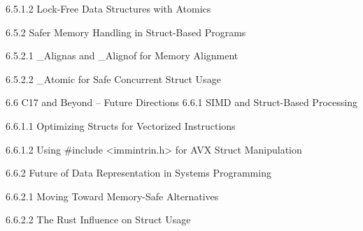 6.5.1.2 Lock-Free Data Structures with Atomics

6.5.2 Safer Memory Handling in Struct-Based Programs

6.5.2.1 _Alignas and _Alignof for Memory Alignment

6.5.2.2 _Atomic for Safe Concurrent Struct Usage

6.6 C17 and Beyond – Future Directions
6.6.1 SIMD and Struct-Based Processing

6.6.1.1 Optimizing Structs for Vectorized Instructions

6.6.1.2 Using #include <immintrin.h> for AVX Struct Manipulation

6.6.2 Future of Data Representation in Systems Programming

6.6.2.1 Moving Toward Memory-Safe Alternatives

6.6.2.2 The Rust Influence on Struct Usage
